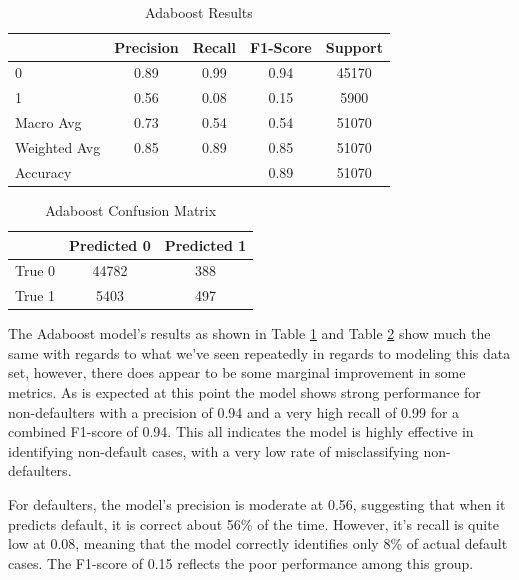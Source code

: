 \documentclass[12pt]{article}
\begin{document}
\begin{table}[htbp]
    \centering
    \caption{Adaboost Results}
    \begin{tabular}{lcccc}
        \toprule
        & Precision & Recall & F1-Score & Support \\
        \midrule
        0 & 0.89 & 0.99 & 0.94 & 45170 \\
        1 & 0.56 & 0.08 & 0.15 & 5900 \\
        Macro Avg & 0.73 & 0.54 & 0.54 & 51070 \\
        Weighted Avg & 0.85 & 0.89 & 0.85 & 51070 \\
        \midrule
        Accuracy & & & 0.89 & 51070 \\
        \bottomrule
    \end{tabular}
    \label{table:adaboostResults}
\end{table}

\begin{table}[htbp]
    \centering
    \caption{Adaboost Confusion Matrix}
    \begin{tabular}{lcc}
        \toprule
        & Predicted 0 & Predicted 1 \\
        \midrule
        True 0 & 44782 & 388 \\
        True 1 & 5403 & 497 \\
        \bottomrule
    \end{tabular}
    \label{table:adaboostConfusionMatrix}
\end{table}

The Adaboost model's results as shown in Table \ref{table:adaboostResults} and Table \ref{table:adaboostConfusionMatrix} show much the same with regards to what we've seen repeatedly in regards to modeling this data set, however, there does appear to be some marginal improvement in some metrics. As is expected at this point the model shows strong performance for non-defaulters with a precision of 0.94 and a very high recall of 0.99 for a combined F1-score of 0.94. This all indicates the model is highly effective in identifying non-default cases, with a very low rate of misclassifying non-defaulters.

For defaulters, the model's precision is moderate at 0.56, suggesting that when it predicts default, it is correct about 56\% of the time. However, it's recall is quite low at 0.08, meaning that the model correctly identifies only 8\% of actual default cases. The F1-score of 0.15 reflects the poor performance among this group.
\end{document}
